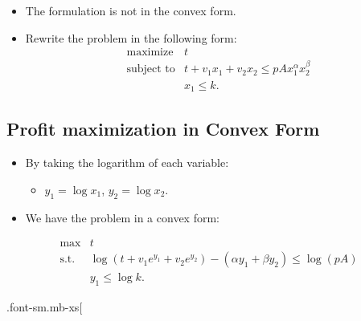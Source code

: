 \documentclass[
]{article}
\providecommand{\tightlist}{%
  \setlength{\itemsep}{0pt}\setlength{\parskip}{0pt}}
\begin{document}
\begin{itemize}
\tightlist
\item
  The formulation is not in the convex form.
\item
  Rewrite the problem in the following form: \[\begin{array}{ll}
    \text{maximize} & t \\
    \text{subject to} & t  + v_1 x_1  + v_2 x_2 \le p A x_1^{\alpha} x_2^{\beta}\\
                  & x_1 \le k.
    \end{array}\]
\end{itemize}

\hypertarget{profit-maximization-in-convex-form}{%
\subsection{Profit maximization in Convex Form}\label{profit-maximization-in-convex-form}}

\begin{itemize}
\item
  By taking the logarithm of each variable:

  \begin{itemize}
  \tightlist
  \item
    \(y_1 = \log x_1\), \(y_2 = \log x_2\).
  \end{itemize}
\item
  We have the problem in a convex form:
\end{itemize}

\[\begin{array}{ll}
    \text{max}  & t \\
    \text{s.t.} & \log(t + v_1 e^{y_1} + v_2 e^{y_2}) - (\alpha y_1 + \beta y_2) \le \log(pA) \\
                & y_1 \le \log k.
\end{array}\]

.font-sm.mb-xs{[}
\end{document}
